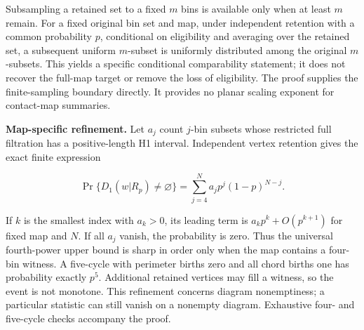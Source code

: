 \documentclass[
  11pt,
]{article}
\begin{document}
Subsampling a retained set to a fixed \(m\) bins is available only when
at least \(m\) remain. For a fixed original bin set and map, under
independent retention with a common probability \(p\), conditional on
eligibility and averaging over the retained set, a subsequent uniform
\(m\)-subset is uniformly distributed among the original \(m\)-subsets.
This yields a specific conditional comparability statement; it does not
recover the full-map target or remove the loss of eligibility. The proof
supplies the finite-sampling boundary directly. It provides no planar
scaling exponent for contact-map summaries.

\textbf{Map-specific refinement.} Let \(a_j\) count \(j\)-bin subsets
whose restricted full filtration has a positive-length H1 interval.
Independent vertex retention gives the exact finite expression

\[\Pr\{D_1(w|R_p)\ne\varnothing\}=\sum_{j=4}^N a_jp^j(1-p)^{N-j}.\]

If \(k\) is the smallest index with \(a_k > 0\), its leading term is
\(a_k p^k + O(p^{k+1})\) for fixed map and \(N\). If all \(a_j\) vanish,
the probability is zero. Thus the universal fourth-power upper bound is
sharp in order only when the map contains a four-bin witness. A
five-cycle with perimeter births zero and all chord births one has
probability exactly \(p^5\). Additional retained vertices may fill a
witness, so the event is not monotone. This refinement concerns diagram
nonemptiness; a particular statistic can still vanish on a nonempty
diagram. Exhaustive four- and five-cycle checks accompany the proof.
\end{document}
